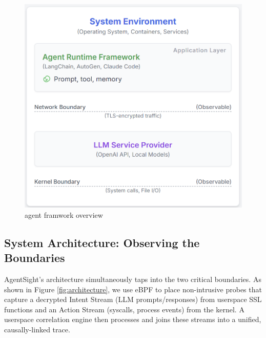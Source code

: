 \begin{figure}[h!]
    \centering
    \includegraphics[width=\columnwidth]{figture/agent.png}
    \caption{agent framwork overview}
    \label{fig:agent}
\end{figure}

\subsection{System Architecture: Observing the Boundaries}

AgentSight's architecture simultaneously taps into the two critical boundaries. As shown in Figure \ref{fig:architecture}, we use eBPF to place non-intrusive probes that capture a decrypted Intent Stream (LLM prompts/responses) from userspace SSL functions and an Action Stream (syscalls, process events) from the kernel. A userspace correlation engine then processes and joins these streams into a unified, causally-linked trace.

